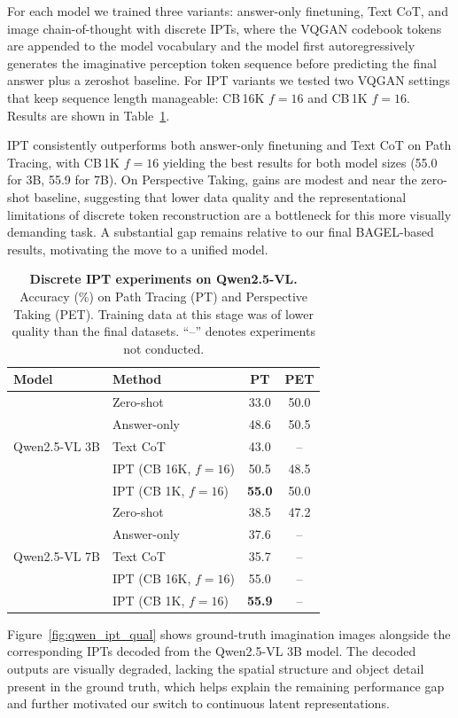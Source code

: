 \documentclass{llmxive}
\begin{document}
For each model we trained three variants: answer-only finetuning, Text CoT, and image chain-of-thought with discrete IPTs, where the VQGAN codebook tokens are appended to the model vocabulary and the model first autoregressively generates the imaginative perception token sequence before predicting the final answer plus a zeroshot baseline. For IPT variants we tested two VQGAN settings that keep sequence length manageable: CB\,16K $f{=}16$ and CB\,1K $f{=}16$. Results are shown in Table~\ref{tab:qwen_discrete}.

IPT consistently outperforms both answer-only finetuning and Text CoT on Path Tracing, with CB\,1K $f{=}16$ yielding the best results for both model sizes (55.0 for 3B, 55.9 for 7B). On Perspective Taking, gains are modest and near the zero-shot baseline, suggesting that lower data quality and the representational limitations of discrete token reconstruction are a bottleneck for this more visually demanding task. A substantial gap remains relative to our final BAGEL-based results, motivating the move to a unified model.

\begin{table}[t]
\centering
\setlength{\tabcolsep}{6pt}
\begin{tabular}{llcc}
\toprule
\textbf{Model} & \textbf{Method} & \textbf{PT} & \textbf{PET} \\
\midrule
\multirow{5}{*}{Qwen2.5-VL 3B}
 & Zero-shot               & 33.0          & 50.0 \\
 & Answer-only             & 48.6          & 50.5 \\
 & Text CoT                & 43.0          & --   \\
 & IPT (CB 16K, $f{=}16$) & 50.5          & 48.5 \\
 & IPT (CB 1K,\phantom{0} $f{=}16$)  & \textbf{55.0} & 50.0 \\
\midrule
\multirow{5}{*}{Qwen2.5-VL 7B}
 & Zero-shot               & 38.5          & 47.2   \\
 & Answer-only             & 37.6          & --   \\
 & Text CoT                & 35.7          & --   \\
 & IPT (CB 16K, $f{=}16$) & 55.0          & --   \\
 & IPT (CB 1K,\phantom{0} $f{=}16$)  & \textbf{55.9} & --   \\
\bottomrule
\end{tabular}
\caption{\textbf{Discrete IPT experiments on Qwen2.5-VL.} Accuracy (\%) on Path Tracing (PT) and Perspective Taking (PET). Training data at this stage was of lower quality than the final datasets. ``--'' denotes experiments not conducted.}
\label{tab:qwen_discrete}
\end{table}
Figure~\ref{fig:qwen_ipt_qual} shows ground-truth imagination images alongside the corresponding IPTs decoded from the Qwen2.5-VL 3B model. The decoded outputs are visually degraded, lacking the spatial structure and object detail present in the ground truth, which helps explain the remaining performance gap and further motivated our switch to continuous latent representations.
\end{document}
